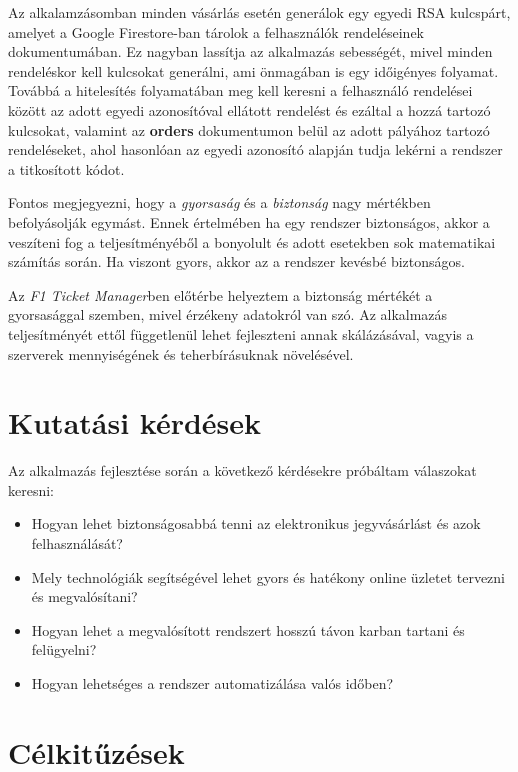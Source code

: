 Az alkalamzásomban minden vásárlás esetén generálok egy egyedi RSA kulcspárt, amelyet a Google Firestore-ban tárolok a felhasználók rendeléseinek dokumentumában. Ez nagyban lassítja az alkalmazás sebességét, mivel minden rendeléskor kell kulcsokat generálni, ami önmagában is egy időigényes folyamat. Továbbá a hitelesítés folyamatában meg kell keresni a felhasználó rendelései között az adott egyedi azonosítóval ellátott rendelést és ezáltal a hozzá tartozó kulcsokat, valamint az \textbf{orders} dokumentumon belül az adott pályához tartozó rendeléseket, ahol hasonlóan az egyedi azonosító alapján tudja lekérni a rendszer a titkosított kódot.

Fontos megjegyezni, hogy a \textit{gyorsaság} és a \textit{biztonság} nagy mértékben befolyásolják egymást. Ennek értelmében ha egy rendszer biztonságos, akkor a veszíteni fog a teljesítményéből a bonyolult és adott esetekben sok matematikai számítás során. Ha viszont gyors, akkor az a rendszer kevésbé biztonságos.

Az \textit{F1 Ticket Manager}ben előtérbe helyeztem a biztonság mértékét a gyorsasággal szemben, mivel érzékeny adatokról van szó. Az alkalmazás teljesítményét ettől függetlenül lehet fejleszteni annak skálázásával, vagyis a szerverek mennyiségének és teherbírásuknak növelésével.

\section {Kutatási kérdések} \label{research}

Az alkalmazás fejlesztése során a következő kérdésekre próbáltam válaszokat keresni:
\begin{itemize}
	\item Hogyan lehet biztonságosabbá tenni az elektronikus jegyvásárlást és azok felhasználását?
	\item Mely technológiák segítségével lehet gyors és hatékony online üzletet tervezni és megvalósítani?
	\item Hogyan lehet a megvalósított rendszert hosszú távon karban tartani és felügyelni?
	\item Hogyan lehetséges a rendszer automatizálása valós időben?
\end{itemize}

\section {Célkitűzések} \label{scopes}

